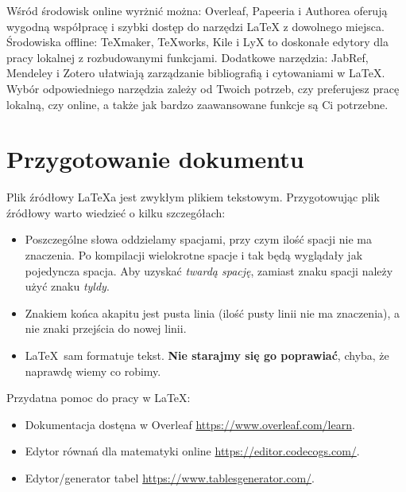 Wśród środowisk online wyrżnić można: Overleaf, Papeeria i Authorea oferują wygodną współpracę i szybki dostęp do narzędzi LaTeX z dowolnego miejsca. Środowiska offline: TeXmaker, TeXworks, Kile i LyX to doskonałe edytory dla pracy lokalnej z rozbudowanymi funkcjami. Dodatkowe narzędzia: JabRef, Mendeley i Zotero ułatwiają zarządzanie bibliografią i cytowaniami w LaTeX. Wybór odpowiedniego narzędzia zależy od Twoich potrzeb, czy preferujesz pracę lokalną, czy online, a także jak bardzo zaawansowane funkcje są Ci potrzebne.


\section{Przygotowanie dokumentu}
\label{sec:przygotowanieDokumentu}

Plik źródłowy \LaTeX a jest zwykłym plikiem tekstowym. Przygotowując plik
źródłowy warto wiedzieć o kilku szczegółach:

\begin{itemize}
      \item
            Poszczególne słowa oddzielamy spacjami, przy czym ilość spacji nie ma znaczenia.
            Po kompilacji wielokrotne spacje i tak będą wyglądały jak pojedyncza spacja.
            Aby uzyskać {\em twardą spację}, zamiast znaku spacji należy użyć znaku {\em
                        tyldy}.

      \item
            Znakiem końca akapitu jest pusta linia (ilość pusty linii nie ma znaczenia), a
            nie znaki przejścia do nowej linii.

      \item
            \LaTeX~sam formatuje tekst. \textbf{Nie starajmy się go poprawiać}, chyba, że
            naprawdę wiemy co robimy.
\end{itemize}


\noindent Przydatna pomoc do pracy w \LaTeX:
\begin{itemize}
      \item Dokumentacja dostęna w Overleaf \url{https://www.overleaf.com/learn}.
      \item Edytor równań dla matematyki online \url{https://editor.codecogs.com/}.
      \item  Edytor/generator tabel \url{https://www.tablesgenerator.com/}.
\end{itemize}


